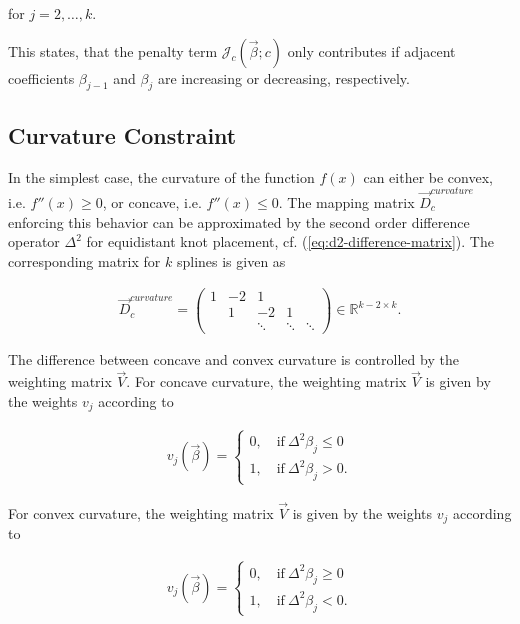 \documentclass[10pt,a4paper]{report}
\begin{document}
for $j=2, \dots, k$.

This states, that the penalty term $\mathcal{J}_c(\vec{\beta}; c)$ only contributes if adjacent coefficients $\beta_{j-1}$ and $\beta_j$ are increasing or decreasing, respectively. \cite{hofner2011monotonicity} \cite{eilers2005unimodal}

\subsection{Curvature Constraint}

In the simplest case, the curvature of the function $f(x)$ can either be convex, i.e. $f''(x) \ge 0$, or concave, i.e. $f''(x) \le 0$. The mapping matrix $\vec{D}_c^{curvature}$ enforcing this behavior can be approximated by the second order difference operator $\Delta^2$ for equidistant knot placement, cf. (\ref{eq:d2-difference-matrix}). The corresponding matrix for $k$ splines is given as

\begin{align} \label{eq:D_c_curvature}
	\vec{D}_c^{curvature} = \begin{pmatrix} 1 & -2 & 1 		&  		 & \\ 
		& 1  &-2 	    &1 		 & \\
		& 	  & \ddots  & \ddots & \ddots  
	\end{pmatrix} \in \mathbb{R}^{k-2 \times k}.
\end{align}	

The difference between concave and convex curvature is controlled by the weighting matrix $\vec{V}$. For concave curvature, the weighting matrix $\vec{V}$ is given by the weights $v_j$ according to

\begin{align}\label{eq:v_curvature_concave}
	v_j(\vec{\beta}) = \begin{cases} 
		0, \quad \text{if} \ \Delta^2\beta_j \le 0 \\ 
		1, \quad \text{if} \ \Delta^2\beta_j > 0. 
	\end{cases}
\end{align}

For convex curvature, the weighting matrix $\vec{V}$ is given by the weights $v_j$ according to

\begin{align}\label{eq:v_curvature_convex}
	v_j(\vec{\beta}) = \begin{cases} 
		0, \quad \text{if} \ \Delta^2\beta_j \ge 0 \\ 
		1, \quad \text{if} \ \Delta^2\beta_j < 0. 
	\end{cases}
\end{align}	
\end{document}
